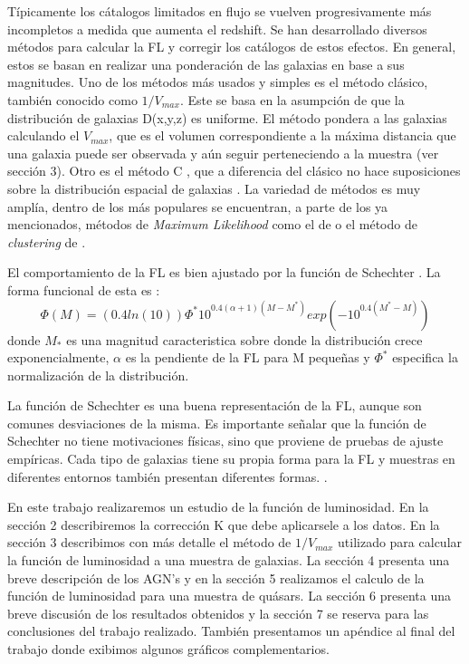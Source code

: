 \documentclass[a4paper,10pt]{article}
\begin{document}
T\'ipicamente los c\'atalogos limitados en flujo se vuelven progresivamente m\'as incompletos a medida que aumenta el redshift. Se han desarrollado diversos m\'etodos para calcular la FL y corregir los cat\'alogos de estos efectos. En general, estos se basan en realizar una ponderaci\'on de las galaxias en base a sus magnitudes. 
Uno de los m\'etodos m\'as usados y simples es el m\'etodo cl\'asico, tambi\'en conocido como $1/V_{max}$.  Este se basa en la asumpci\'on de que la distribuci\'on de galaxias D(x,y,z) es uniforme. El m\'etodo pondera a las galaxias calculando el $V_{max}$, que es el volumen correspondiente a la m\'axima distancia que una galaxia puede ser observada y a\'un seguir perteneciendo a la muestra (ver secci\'on 3). Otro es el m\'etodo C \citep{Lynden-Bell1971}, que a diferencia del cl\'asico no hace suposiciones sobre la distribuci\'on espacial de galaxias \citep{Lynden-Bell1971}. La variedad de m\'etodos es muy ampl\'ia, dentro de los m\'as populares se encuentran, a parte de los ya mencionados, m\'etodos de \textit{Maximum Likelihood} como el de \citet{Choloniewski1986} o el m\'etodo de \textit{clustering} de \citet{Yee1984}.

El comportamiento de la FL es bien ajustado por la funci\'on de Schechter \citep{Schneider}. La forma funcional de esta es :
\begin{equation}
 \Phi(M)=(0.4ln(10))\Phi^{\ast}10^{0.4(\alpha+1)(M-M^{\ast})}exp{(-10^{0.4(M^{\ast}-M)})}
\end{equation}
donde $M_{\ast}$ es una magnitud caracteristica sobre donde la distribuci\'on crece exponencialmente, $\alpha$ es la pendiente de la FL para M pequeñas y $\Phi^{\ast}$ especifica la normalizaci\'on de la distribuci\'on.

La funci\'on de Schechter es una buena representaci\'on de la FL, aunque son comunes desviaciones de la misma. Es importante se\~nalar que la funci\'on de Schechter no tiene motivaciones f\'isicas, sino que proviene de pruebas de ajuste emp\'iricas. Cada tipo de galaxias tiene su propia forma para la FL y muestras en diferentes entornos tambi\'en presentan diferentes formas. \citep{Schneider}.

En este trabajo realizaremos un estudio de la funci\'on de luminosidad. En la secci\'on 2 describiremos la correcci\'on K que debe aplicarsele a los datos. En la secci\'on 3 describimos con m\'as detalle el m\'etodo de $1/V_{max}$ utilizado para calcular la funci\'on de luminosidad a una muestra de galaxias. La secci\'on 4 presenta una breve descripci\'on de los AGN's y en la secci\'on 5 realizamos el calculo de la funci\'on de luminosidad para una muestra de qu\'asars. La secci\'on 6 presenta una breve discusi\'on de los resultados obtenidos y la secci\'on 7 se reserva para las conclusiones del trabajo realizado. Tambi\'en presentamos un ap\'endice al final del trabajo donde exibimos algunos gr\'aficos complementarios. 
\end{document}

